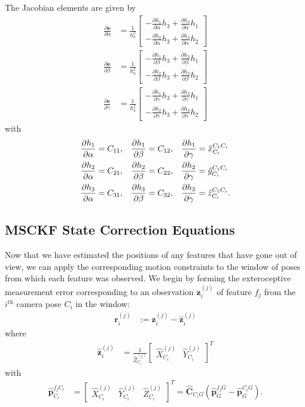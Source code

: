 \documentclass[letterpaper, 10 pt, conference]{ieeeconf}  %
\def\Vec#1{\mathbf{#1}}
\newcommand{\bbm}{\begin{bmatrix}}
\newcommand{\ebm}{\end{bmatrix}}
\begin{document}
The Jacobian elements are given by
\begin{align}
\frac{\partial \Vec e}{\partial \alpha} &= 
    \frac{1}{h_3^2} \bbm -\frac{\partial h_1}{\partial \alpha} h_3 + \frac{\partial h_3}{\partial \alpha} h_1 \\[0.5em]
                        -\frac{\partial h_2}{\partial \alpha} h_3 + \frac{\partial h_3}{\partial \alpha} h_2 \ebm
\\[0.5em]
\frac{\partial \Vec e}{\partial \beta} &= 
    \frac{1}{h_3^2} \bbm -\frac{\partial h_1}{\partial \beta} h_3 + \frac{\partial h_3}{\partial \beta} h_1 \\[0.5em] 
                        -\frac{\partial h_2}{\partial \beta} h_3 + \frac{\partial h_3}{\partial \beta} h_2 \ebm
\\[0.5em]
\frac{\partial \Vec e}{\partial \gamma} &= 
    \frac{1}{h_3^2} \bbm -\frac{\partial h_1}{\partial \gamma} h_3 + \frac{\partial h_3}{\partial \gamma} h_1 \\[0.5em] 
                        -\frac{\partial h_2}{\partial \gamma} h_3 + \frac{\partial h_3}{\partial \gamma} h_2 \ebm
\end{align}
with
\begin{align}
\frac{\partial h_1}{\partial \alpha} &= C_{11}, & \frac{\partial h_1}{\partial \beta} &= C_{12}, & \frac{\partial h_1}{\partial \gamma} &= \hat{x}_{C_i}^{C_1 C_i} \notag \\
\frac{\partial h_2}{\partial \alpha} &= C_{21}, & \frac{\partial h_2}{\partial \beta} &= C_{22}, & \frac{\partial h_2}{\partial \gamma} &= \hat{y}_{C_i}^{C_1 C_i} \\
\frac{\partial h_3}{\partial \alpha} &= C_{31}, & \frac{\partial h_3}{\partial \beta} &= C_{32}, & \frac{\partial h_3}{\partial \gamma} &= \hat{z}_{C_i}^{C_1 C_i} \notag .
\end{align}

\subsection{MSCKF State Correction Equations}
Now that we have estimated the positions of any features that have gone out of view, we can apply the corresponding motion constraints to the window of poses from which each feature was observed.
We begin by forming the exteroceptive measurement error corresponding to an observation $\Vec{z}_i^{(j)}$ of feature $f_j$ from the $i^\text{th}$ camera pose $C_i$ in the window:
\begin{align} \label{eq:residual_def}
    \Vec{r}_i^{(j)} &:= \Vec{z}_i^{(j)} - \hat{\Vec{z}}_i^{(j)}
\end{align}
where
\begin{align}
    \hat{\Vec{z}}_i^{(j)} &= \frac{1}{\hat{Z}^{(j)}_{C_i}} \bbm \hat{X}^{(j)}_{C_i} & \hat{Y}^{(j)}_{C_i} \ebm ^T
\end{align}
with 
\begin{align}
    \hat{\Vec{p}}_{C_i}^{f_j C_i} &= \bbm \hat{X}^{(j)}_{C_i} & \hat{Y}^{(j)}_{C_i} & \hat{Z}^{(j)}_{C_i} \ebm ^T = \hat{\Vec{C}}_{C_i G} \left( \hat{\Vec{p}}_G^{f_j G} - \hat{\Vec{p}}_G^{C_i G} \right).
\end{align}
\end{document}
